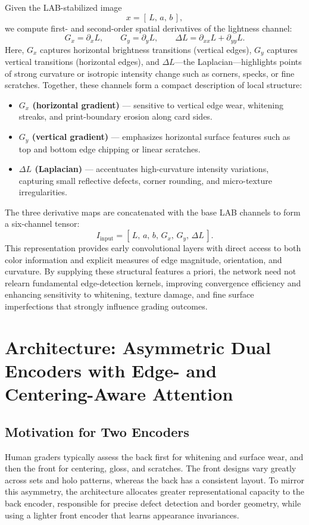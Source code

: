 \documentclass[12pt]{article}
\begin{document}
Given the LAB-stabilized image
\[
x = [\,L,\,a,\,b\,],
\]
we compute first- and second-order spatial derivatives of the lightness channel:
\[
G_x = \partial_x L, \qquad 
G_y = \partial_y L, \qquad 
\Delta L = \partial_{xx}L + \partial_{yy}L.
\]
Here, $G_x$ captures horizontal brightness transitions (vertical edges), $G_y$ captures vertical transitions (horizontal edges), and $\Delta L$---the Laplacian---highlights points of strong curvature or isotropic intensity change such as corners, specks, or fine scratches.  
Together, these channels form a compact description of local structure:
\begin{itemize}
    \item \textbf{$G_x$ (horizontal gradient)} --- sensitive to vertical edge wear, whitening streaks, and print-boundary erosion along card sides.
    \item \textbf{$G_y$ (vertical gradient)} --- emphasizes horizontal surface features such as top and bottom edge chipping or linear scratches.
    \item \textbf{$\Delta L$ (Laplacian)} --- accentuates high-curvature intensity variations, capturing small reflective defects, corner rounding, and micro-texture irregularities.
\end{itemize}

The three derivative maps are concatenated with the base LAB channels to form a six-channel tensor:
\[
I_{\text{input}} = [\,L,\,a,\,b,\,G_x,\,G_y,\,\Delta L\,].
\]
This representation provides early convolutional layers with direct access to both color information and explicit measures of edge magnitude, orientation, and curvature. 
By supplying these structural features a priori, the network need not relearn fundamental edge-detection kernels, improving convergence efficiency and enhancing sensitivity to whitening, texture damage, and fine surface imperfections that strongly influence grading outcomes.




\section{Architecture: Asymmetric Dual Encoders with Edge- and Centering-Aware Attention}

\subsection{Motivation for Two Encoders}
Human graders typically assess the back first for whitening and surface wear, and then the front for centering, gloss, and scratches. 
The front designs vary greatly across sets and holo patterns, whereas the back has a consistent layout. 
To mirror this asymmetry, the architecture allocates greater representational capacity to the back encoder, responsible for precise defect detection and border geometry, while using a lighter front encoder that learns appearance invariances.
\end{document}

